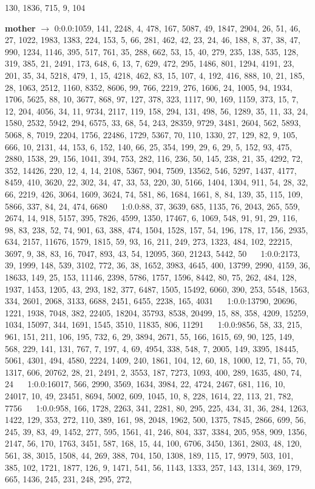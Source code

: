 \documentclass[a4paper,11pt,oneside]{book}
\begin{document}
130, 1836, 715, 9, 104	$\quad$	

\textbf{mother} $\rightarrow$	0:0.0:1059, 141, 2248, 4, 478, 167, 5087, 49, 1847, 2904, 26, 51, 46, 27, 1022, 1983, 1383, 224, 153, 5, 66, 281, 462, 42, 23, 24, 46, 188, 8, 37, 38, 47, 990, 1234, 1146, 395, 517, 761, 35, 288, 662, 53, 15, 40, 279, 235, 138, 535, 128, 319, 385, 21, 2491, 173, 648, 6, 13, 7, 629, 472, 295, 1486, 801, 1294, 4191, 23, 201, 35, 34, 5218, 479, 1, 15, 4218, 462, 83, 15, 107, 4, 192, 416, 888, 10, 21, 185, 28, 1063, 2512, 1160, 8352, 8606, 99, 766, 2219, 276, 1606, 24, 1005, 94, 1934, 1706, 5625, 88, 10, 3677, 868, 97, 127, 378, 323, 1117, 90, 169, 1159, 373, 15, 7, 12, 204, 4056, 34, 11, 9734, 2117, 119, 158, 294, 131, 498, 56, 1289, 35, 11, 33, 24, 1580, 2532, 5942, 294, 6575, 33, 68, 54, 243, 28359, 9729, 3481, 2604, 562, 5893, 5068, 8, 7019, 2204, 1756, 22486, 1729, 5367, 70, 110, 1330, 27, 129, 82, 9, 105, 666, 10, 2131, 44, 153, 6, 152, 140, 66, 25, 354, 199, 29, 6, 29, 5, 152, 93, 475, 2880, 1538, 29, 156, 1041, 394, 753, 282, 116, 236, 50, 145, 238, 21, 35, 4292, 72, 352, 14426, 220, 12, 4, 14, 2108, 5367, 904, 7509, 13562, 546, 5297, 1437, 4177, 8459, 410, 3620, 22, 302, 34, 47, 33, 53, 220, 30, 5166, 1404, 1304, 911, 54, 28, 32, 66, 2219, 426, 3064, 1609, 3624, 74, 581, 86, 1684, 1661, 8, 84, 139, 35, 115, 109, 5866, 337, 84, 24, 474, 6680	$\quad$	1:0.0:88, 37, 3639, 685, 1135, 76, 2043, 265, 559, 2674, 14, 918, 5157, 395, 7826, 4599, 1350, 17467, 6, 1069, 548, 91, 91, 29, 116, 98, 83, 238, 52, 74, 901, 63, 388, 474, 1504, 1528, 157, 54, 196, 178, 17, 156, 2935, 634, 2157, 11676, 1579, 1815, 59, 93, 16, 211, 249, 273, 1323, 484, 102, 22215, 3697, 9, 38, 83, 16, 7047, 893, 43, 54, 12095, 360, 21243, 5442, 50	$\quad$	1:0.0:2173, 39, 1999, 148, 539, 3102, 772, 36, 38, 1652, 3983, 4645, 400, 13799, 2990, 4159, 36, 18633, 149, 25, 153, 11146, 2398, 5786, 1757, 1596, 8442, 80, 75, 262, 484, 128, 1937, 1453, 1205, 43, 293, 182, 377, 6487, 1505, 15492, 6060, 390, 253, 5548, 1563, 334, 2601, 2068, 3133, 6688, 2451, 6455, 2238, 165, 4031	$\quad$	1:0.0:13790, 20696, 1221, 1938, 7048, 382, 22405, 18204, 35793, 8538, 20499, 15, 88, 358, 4209, 15259, 1034, 15097, 344, 1691, 1545, 3510, 11835, 806, 11291	$\quad$	1:0.0:9856, 58, 33, 215, 961, 151, 211, 106, 195, 732, 6, 29, 3894, 2671, 55, 166, 1615, 69, 90, 125, 149, 568, 229, 141, 131, 767, 7, 197, 4, 69, 4954, 338, 548, 7, 2005, 149, 3395, 18445, 5061, 4301, 494, 4580, 2224, 1409, 240, 1861, 104, 12, 60, 18, 1000, 12, 71, 55, 70, 1317, 606, 20762, 28, 21, 2491, 2, 3553, 187, 7273, 1093, 400, 289, 1635, 480, 74, 24	$\quad$	1:0.0:16017, 566, 2990, 3569, 1634, 3984, 22, 4724, 2467, 681, 116, 10, 24017, 10, 49, 23451, 8694, 5002, 609, 1045, 10, 8, 228, 1614, 22, 113, 21, 782, 7756	$\quad$	1:0.0:958, 166, 1728, 2263, 341, 2281, 80, 295, 225, 434, 31, 36, 284, 1263, 1422, 129, 353, 272, 110, 389, 161, 98, 2048, 1962, 500, 1375, 7845, 2866, 699, 56, 245, 39, 83, 49, 1452, 277, 595, 1561, 41, 246, 804, 337, 3384, 205, 958, 909, 1356, 2147, 56, 170, 1763, 3451, 587, 168, 15, 44, 100, 6706, 3450, 1361, 2803, 48, 120, 561, 38, 3015, 1508, 44, 269, 388, 704, 150, 1308, 189, 115, 17, 9979, 503, 101, 385, 102, 1721, 1877, 126, 9, 1471, 541, 56, 1143, 1333, 257, 143, 1314, 369, 179, 665, 1436, 245, 231, 248, 295, 272, 
\end{document}
